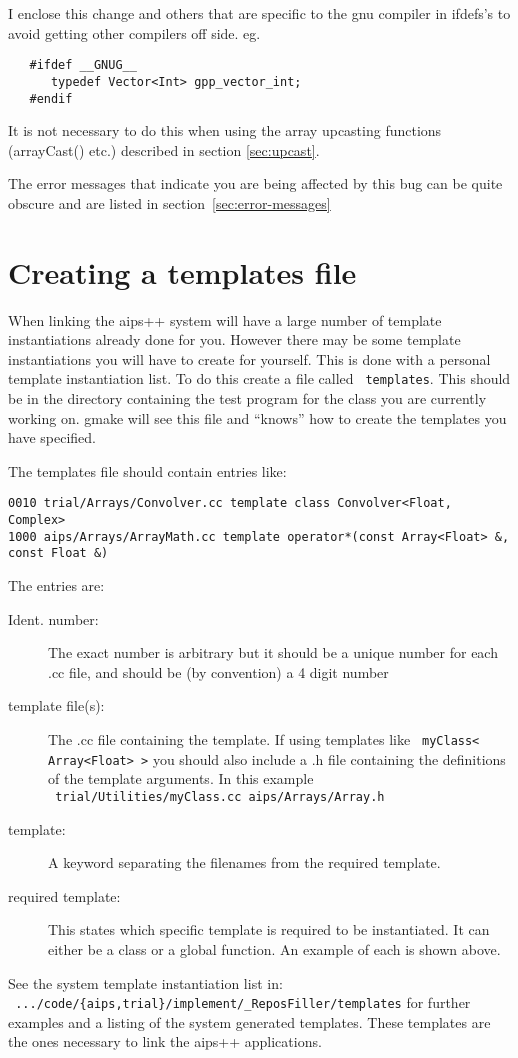 I enclose this change and others that are specific to the gnu compiler in
ifdefs's to avoid getting other compilers off side. eg.
\begin{verbatim}
   #ifdef __GNUG__
      typedef Vector<Int> gpp_vector_int;
   #endif
\end{verbatim}
It is not necessary to do this when using the array upcasting functions
(arrayCast() etc.) described in section \ref{sec:upcast}.

The error messages that indicate you are being affected by this bug can be
quite obscure and are listed in section~\ref{sec:error-messages}

\section{Creating a templates file}
When linking the aips++ system will have a large number of template
instantiations already done for you. However there may be some template
instantiations you will have to create for yourself. This is done with a
personal template instantiation list. To do this create a file called
\texttt{ templates}. This should be in the directory containing the test
program for the class you are currently working on. gmake will see this file
and ``knows'' how to create the templates you have specified.

The templates file should contain entries like:
\begin{verbatim}
0010 trial/Arrays/Convolver.cc template class Convolver<Float, Complex>
1000 aips/Arrays/ArrayMath.cc template operator*(const Array<Float> &, const Float &)
\end{verbatim}

The entries are:
\begin{description}
\item[Ident. number:] The exact number is arbitrary but it should be a
  unique number for each .cc file, and should be (by convention) a 4 digit
  number
\item[template file(s):] The .cc file containing the template. If using
  templates like \texttt{ myClass< Array<Float> >} you should also
  include a .h file containing the definitions of the
  template arguments. In this example \\
  \texttt{ trial/Utilities/myClass.cc aips/Arrays/Array.h}
\item[template:] A keyword separating the filenames from the required template.
\item[required template:] This states which specific template is required
  to be instantiated. It can either be a class or a global
  function. An example of each is shown above.
\end{description}
See the system template instantiation list in: \\
\texttt{ .../code/\{aips,trial\}/implement/\_ReposFiller/templates} 
for further examples and a listing of the system generated 
templates. These templates are the ones necessary to link the aips++
applications.

